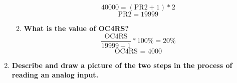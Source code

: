 \documentclass{article}
\begin{document}
\begin{enumerate}[label=\textbf{\arabic*})]
\begin{enumerate}[label=\textbf{\alph*}.]
        $$40000 = (\text{PR2} + 1) * 2$$
        \vspace{0.5em}
        $$\text{PR2} = 19999$$

        \item \textbf{What is the value of OC4RS?} \\
        
        $$\frac{\text{OC4RS}}{19999 + 1} * 100\% = 20\%$$
        \vspace{0.5em}
        $$\text{OC4RS = 4000}$$
    \end{enumerate}

    \pagebreak
    \item \textbf{Describe and draw a picture of the two steps in the process of reading an analog input.}


\end{enumerate}
\end{document}

